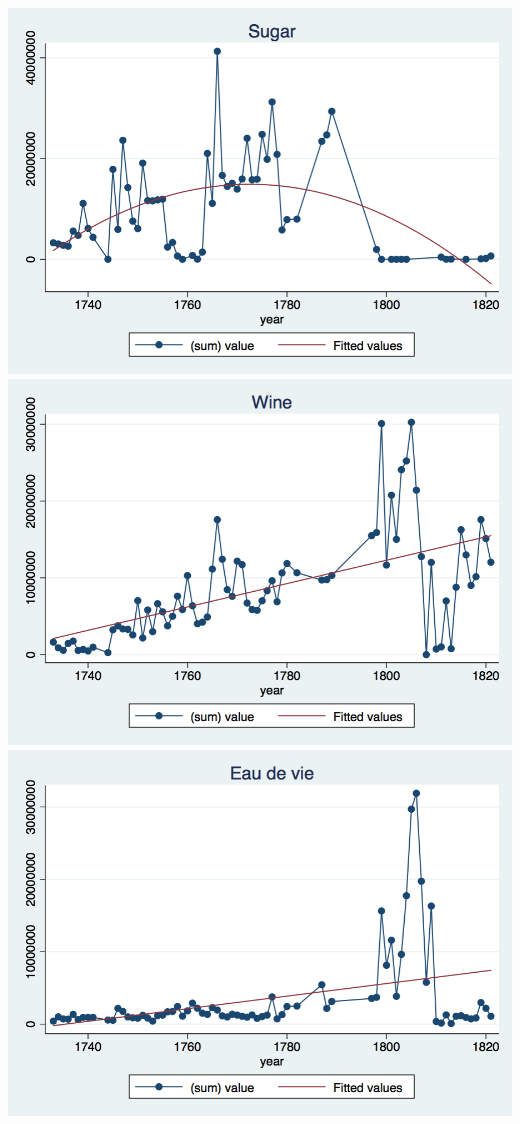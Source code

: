 \documentclass[12pt,a4paper,titlepage,english]{article}
\begin{document}
\includegraphics[scale=.28]{sugar_qfit.png}
\includegraphics[scale=.28]{wine_lfit.png}
\includegraphics[scale=.28]{eau_lfit.png}\\
\end{document}
